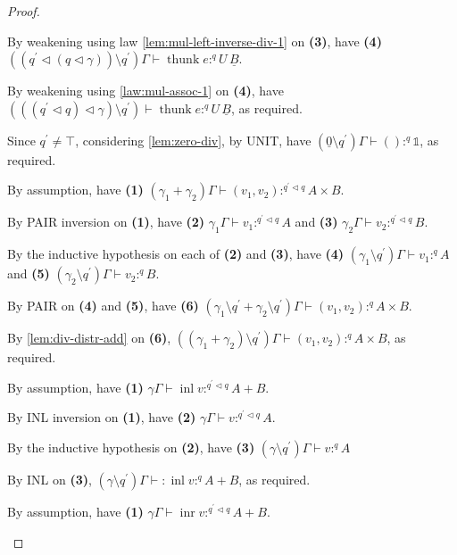 \documentclass[acmsmall,screen,nonacm]{acmart}
\DeclareMathOperator{\thunk}{\text{thunk}}
\newcommand{\unit}{\mathbb{1}}
\DeclareMathOperator{\inl}{\text{inl}}
\DeclareMathOperator{\inr}{\text{inr}}
\newcommand{\tee}{\vdash}
\DeclareMathOperator{\scale}{\mathbin{\triangleleft}}
\begin{document}
\begin{proof}
\begin{description}
    By weakening using law \ref{lem:mul-left-inverse-div-1} on \textbf{(3)}, have \textbf{(4)} $((q^\prime \scale (q \scale \gamma)) \setminus q^\prime)\Gamma \tee \thunk e :^q U \, \underline{B}$.

    By weakening using \ref{law:mul-assoc-1} on \textbf{(4)}, have $(((q^\prime \scale q) \scale \gamma) \setminus q^\prime) \tee \thunk e :^q U \, \underline{B}$, as required.
    \\
    \item[Case UNIT ???.]
    Since $q^\prime \ne \top$, considering \ref{lem:zero-div}, by UNIT, have $(\underline{0} \setminus q^\prime)\Gamma \tee () :^q \unit$, as required.
    \\
    \item[Case PAIR.]
    By assumption, have \textbf{(1)} $(\gamma_1 + \gamma_2)\Gamma \tee (v_1, v_2) :^{q^\prime \scale q} A \times B$.

    By PAIR inversion on \textbf{(1)}, have \textbf{(2)} $\gamma_1\Gamma \tee v_1 :^{q^\prime \scale q} A$ and \textbf{(3)} $\gamma_2\Gamma \tee v_2 :^{q^\prime \scale q} B$.

    By the inductive hypothesis on each of \textbf{(2)} and \textbf{(3)}, have \textbf{(4)} $(\gamma_1 \setminus q^\prime)\Gamma \tee v_1 :^q A$ and \textbf{(5)} $(\gamma_2 \setminus q^\prime)\Gamma \tee v_2 :^q B$.

    By PAIR on \textbf{(4)} and \textbf{(5)}, have \textbf{(6)} $(\gamma_1 \setminus q^\prime + \gamma_2 \setminus q^\prime)\Gamma \tee (v_1, v_2) :^q A \times B$.

    By \ref{lem:div-distr-add} on \textbf{(6)}, $((\gamma_1 + \gamma_2) \setminus q^\prime)\Gamma \tee (v_1, v_2) :^q A \times B$, as required.
    \\
    \item[Case INL.]
    By assumption, have \textbf{(1)} $\gamma\Gamma \tee \inl v :^{q^\prime \scale q} A + B$.

    By INL inversion on \textbf{(1)}, have \textbf{(2)} $\gamma\Gamma \tee v :^{q^\prime \scale q} A$.

    By the inductive hypothesis on \textbf{(2)}, have \textbf{(3)} $(\gamma \setminus q^\prime)\Gamma \tee v :^q A$

    By INL on \textbf{(3)}, $(\gamma \setminus q^\prime)\Gamma \tee : \inl v :^q A + B$, as required.
    \\
    \item[Case INR.]
    By assumption, have \textbf{(1)} $\gamma\Gamma \tee \inr v :^{q^\prime \scale q} A + B$.


\end{description}
\end{proof}
\end{document}
